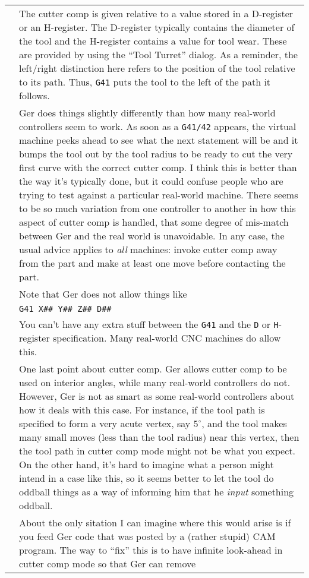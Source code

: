 \documentclass[titlepage,oneside,10pt]{article}
\begin{document}
\begin{longtable}{lp{10cm}}
& The cutter comp is given relative to a value stored in a
D-register or an H-register. The D-register typically contains the
diameter of the tool and the H-register contains a value for tool
wear. These are provided by using the ``Tool Turret'' dialog. As a
reminder, the left/right distinction here refers to the 
position of the tool relative to its path. Thus, {\tt G41} puts the
tool to the left of the path it follows.\\
&Ger does things slightly differently than how many real-world
controllers seem to work. As soon as a {\tt G41/42} appears, the
virtual machine peeks ahead to see what the next statement will be and
it bumps the tool out by the tool radius to be ready to cut the very
first curve with the correct cutter comp. I think this is better than the way
it's typically done, but it could confuse people who are trying to
test against a particular real-world machine. There seems to
be so much variation from one controller to another in how this aspect of
cutter comp is handled, that some degree of mis-match between Ger and
the real world is unavoidable. In any case, the usual advice applies
to \emph{all} machines: invoke cutter comp away from the part and make
at least one move before contacting the part. \\
& Note that Ger does not allow things like\\
& {\tt G41 X\#\# Y\#\# Z\#\# D\#\#}\\
& You can't have any extra stuff between the {\tt G41} and the {\tt D}
or {\tt H}-register specification. Many real-world CNC machines do
allow this.\\
& One last point about cutter comp. Ger allows cutter comp to be used
on interior angles, while many real-world controllers do not. However,
Ger is not as smart as some real-world controllers about how it deals
with this case. For instance, if the tool path is specified to form a
very acute vertex, say $5^\circ$, and the tool makes many small moves (less
than the tool radius) near this vertex, then the tool path in cutter
comp mode might not be what you expect. On the other hand, it's hard
to imagine what a person might intend in a case like this, so it seems
better to let the tool do oddball things as a way of informing him
that he \emph{input} something oddball. \\
& About the only sitation I
can imagine where this would arise is if you feed Ger code that was
posted by a (rather stupid) CAM program. The way to ``fix'' this is to
have infinite look-ahead in cutter comp mode so that Ger can remove

\end{longtable}
\end{document}
